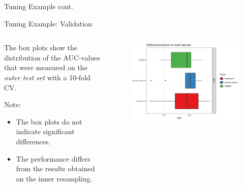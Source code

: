 \begin{frame}{Tuning Example cont.}
\end{frame}

\begin{frame}{Tuning Example: Validation}

\begin{columns}
\begin{column}{0.4\textwidth}
  \footnotesize

  The box plots show the distribution of the AUC-values that were measured on the \emph{outer test set} with a 10-fold CV.

  Note:

  \begin{itemize}
    \item The box plots do not indicate significant differences.
    \item The performance differs from the results obtained on the inner resampling.
  \end{itemize}

\end{column}
\begin{column}{0.6\textwidth}
  \vspace{-1em}
  \begin{figure}
  \includegraphics[width=\textwidth]{images/benchmark_boxplot_tuners.png}
  \end{figure}
\end{column}
\end{columns}
\end{frame}

